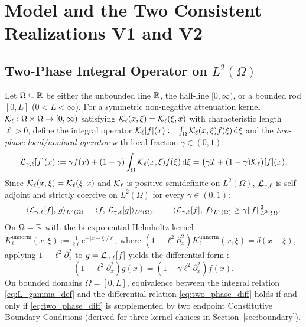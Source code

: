 \section{Model and the Two Consistent Realizations V1 and V2}\label{sec:model}

\subsection{Two-Phase Integral Operator on $L^2(\Omega)$}\label{subsec:operators}

Let $\Omega \subseteq \mathbb{R}$ be either the unbounded line $\mathbb{R}$, the half-line $[0,\infty)$, or a bounded rod $[0,L]$ ($0 < L < \infty$). For a symmetric non-negative attenuation kernel $\mathcal{K}_\ell : \Omega \times \Omega \to [0,\infty)$ satisfying $\mathcal{K}_\ell(x,\xi) = \mathcal{K}_\ell(\xi,x)$ with characteristic length $\ell > 0$, define the integral operator $\mathcal{K}_\ell[f](x) := \int_\Omega \mathcal{K}_\ell(x,\xi)f(\xi)\,\mathrm{d}\xi$ and the \emph{two-phase local/nonlocal operator} \cite{BazantJirasek2002,MikhasevNobili2020,NobiliPramanik2025b} with local fraction $\gamma \in (0,1)$:
\begin{equation}\label{eq:L_gamma_def}
  \mathcal{L}_{\gamma,\ell}[f](x) := \gamma f(x) + (1-\gamma)\int_\Omega \mathcal{K}_\ell(x,\xi)f(\xi)\,\mathrm{d}\xi = \big(\gamma\mathcal{I} + (1-\gamma)\mathcal{K}_\ell\big)[f](x).
\end{equation}
Since $\mathcal{K}_\ell(x,\xi) = \mathcal{K}_\ell(\xi,x)$ and $\mathcal{K}_\ell$ is positive-semidefinite on $L^2(\Omega)$, $\mathcal{L}_{\gamma,\ell}$ is self-adjoint and strictly coercive on $L^2(\Omega)$ for every $\gamma \in (0,1)$:
\begin{equation}\label{eq:self_adjoint_coercive}
  \langle \mathcal{L}_{\gamma,\ell}[f],\, g \rangle_{L^2(\Omega)} = \langle f,\, \mathcal{L}_{\gamma,\ell}[g] \rangle_{L^2(\Omega)}, \qquad
  \langle \mathcal{L}_{\gamma,\ell}[f],\, f \rangle_{L^2(\Omega)} \ge \gamma \lVert f \rVert_{L^2(\Omega)}^2.
\end{equation}
On $\Omega = \mathbb{R}$ with the bi-exponential Helmholtz kernel $K_\ell^{\mathrm{unnorm}}(x,\xi) := \frac{1}{2\ell}\mathrm{e}^{-|x-\xi|/\ell}$, where $(1-\ell^2\partial_x^2)K_\ell^{\mathrm{unnorm}}(x,\xi) = \delta(x-\xi)$, applying $1-\ell^2\partial_x^2$ to $g = \mathcal{L}_{\gamma,\ell}[f]$ yields the differential form \cite{FernandezSaez2016,Romano2017,MikhasevNobili2020}:
\begin{equation}\label{eq:two_phase_diff}
  (1 - \ell^2\partial_x^2)g(x) = (1 - \gamma\ell^2\partial_x^2)f(x).
\end{equation}
On bounded domains $\Omega = [0,L]$, equivalence between the integral relation \eqref{eq:L_gamma_def} and the differential relation \eqref{eq:two_phase_diff} holds if and only if \eqref{eq:two_phase_diff} is supplemented by two endpoint Constitutive Boundary Conditions (derived for three kernel choices in Section~\ref{sec:boundary}).


